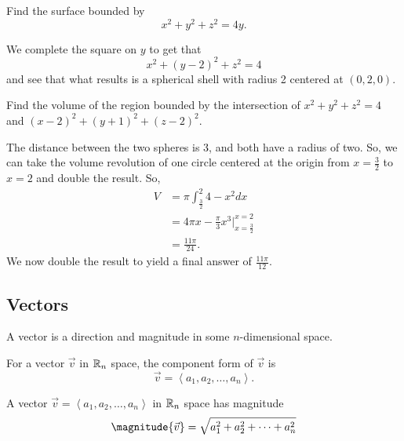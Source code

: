 \documentclass[12pt]{scrartcl}
\begin{document}
\begin{example}
    Find the surface bounded by
    \[x^{2} + y^{2} + z^{2} = 4y.\]

    \begin{soln}
        We complete the square on $y$ to get that
        \[x^{2} + (y - 2)^{2} + z^{2} = 4\]
        and see that what results is a spherical shell with radius 2 centered at $(0, 2, 0)$.
    \end{soln}
\end{example}

\begin{example}
    Find the volume of the region bounded by the intersection of $x^{2} + y^{2} + z^{2} = 4$ and $(x - 2)^{2} + (y + 1)^{2} + (z - 2)^{2}$.

    \begin{soln}
        The distance between the two spheres is 3, and both have a radius of two. So, we can take the volume revolution of one circle centered at the origin from $x = \frac{3}{2}$ to $x = 2$ and double the result. So,
        \begin{align*}
            V &= \pi\int_{\frac{3}{2}}^{2} 4 - x^{2}dx \\
            &= 4\pi x - \frac{\pi}{3}x^{3} \biggr\rvert_{x = \frac{3}{2}}^{x = 2} \\
            &= \frac{11\pi}{24}.
        \end{align*}
        We now double the result to yield a final answer of $\frac{11\pi}{12}$.
    \end{soln}
\end{example}

\subsection{Vectors}

\begin{definition}[Vector]
    A vector is a direction and magnitude in some $n$-dimensional space.
\end{definition}

\begin{definition}
    For a vector $\vec{v}$ in $\mathbb R_{n}$ space, the component form of $\vec{v}$ is
    \[\vec{v} = \left<a_{1}, a_{2}, \dots, a_{n}\right>.\]
\end{definition}

\begin{definition}
    A vector $\vec{v} = \left<a_{1}, a_{2}, \dots, a_{n}\right>$ in $\mathbb R_{n}$ space has magnitude
    \[\magnitude{\vec{v}} = \sqrt{a_{1}^{2} + a_{2}^{2} + \cdots + a_{n}^{2}}\]
\end{definition}
\end{document}
